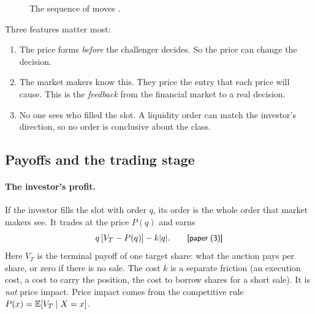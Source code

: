 \begin{figure}[htbp]
\centering
{}
\caption{The sequence of moves .}
\label{fig:02_model-timing}
\end{figure}

Three features matter most:
\begin{enumerate}
\item The price forms \emph{before} the challenger decides. So the price can change the decision.
\item The market makers know this. They price the entry that each price will cause. This is the
\emph{feedback} from the financial market to a real decision.
\item No one sees who filled the slot. A liquidity order can match the investor's direction, so no order
is conclusive about the class.
\end{enumerate}

\subsection{Payoffs and the trading stage}\label{sec:02_model-payoffs}

\paragraph{The investor's profit.} If the investor fills the slot with order \(q\), its order is the whole
order that market makers see. It trades at the price \(P(q)\) and earns
\[
q\,[V_T-P(q)]-k|q|. \tag*{\paper{(3)}}
\]
Here \(V_T\) is the terminal payoff of one target share: what the auction pays per share, or zero if there
is no sale. The cost \(k\) is a separate friction (an execution cost, a cost to carry the position, the
cost to borrow shares for a short sale). It is \emph{not} price impact. Price impact comes from the
competitive rule \(P(x)=\mathbb{E}[V_T\mid X=x]\).


